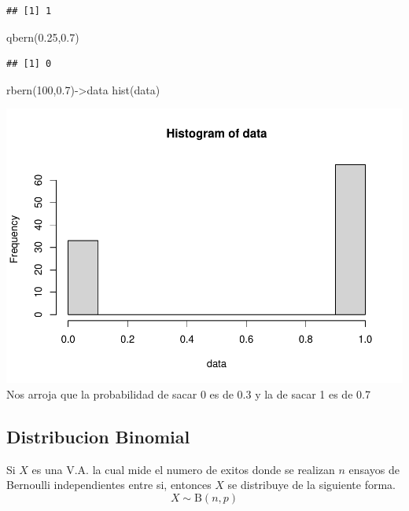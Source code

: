 \documentclass[
]{article}
\newenvironment{Shaded}{\begin{snugshade}}{\end{snugshade}}
\newcommand{\DecValTok}[1]{\textcolor[rgb]{0.00,0.00,0.81}{#1}}
\newcommand{\FloatTok}[1]{\textcolor[rgb]{0.00,0.00,0.81}{#1}}
\newcommand{\FunctionTok}[1]{\textcolor[rgb]{0.00,0.00,0.00}{#1}}
\newcommand{\NormalTok}[1]{#1}
\newcommand{\OtherTok}[1]{\textcolor[rgb]{0.56,0.35,0.01}{#1}}
\begin{document}
\begin{verbatim}
## [1] 1
\end{verbatim}

\begin{Shaded}
\begin{Highlighting}[]
\FunctionTok{qbern}\NormalTok{(}\FloatTok{0.25}\NormalTok{,}\FloatTok{0.7}\NormalTok{)}
\end{Highlighting}
\end{Shaded}

\begin{verbatim}
## [1] 0
\end{verbatim}

\begin{Shaded}
\begin{Highlighting}[]
\FunctionTok{rbern}\NormalTok{(}\DecValTok{100}\NormalTok{,}\FloatTok{0.7}\NormalTok{)}\OtherTok{{-}\textgreater{}}\NormalTok{data}
\FunctionTok{hist}\NormalTok{(data)}
\end{Highlighting}
\end{Shaded}

\includegraphics{Teoria4_files/figure-latex/Primeros experimentos-1.pdf}
Nos arroja que la probabilidad de sacar 0 es de 0.3 y la de sacar 1 es
de 0.7

\hypertarget{distribucion-binomial}{%
\subsection{Distribucion Binomial}\label{distribucion-binomial}}

Si \(X\) es una V.A. la cual mide el numero de exitos donde se realizan
\(n\) ensayos de Bernoulli independientes entre si, entonces \(X\) se
distribuye de la siguiente forma. \[X\sim \text{B}(n,p)\]
\end{document}
